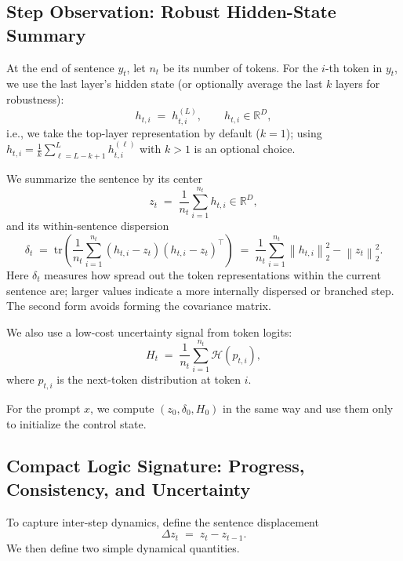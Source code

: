 \documentclass{article}
\newcommand{\R}{\mathbb{R}}
\newcommand{\norm}[1]{\left\lVert #1 \right\rVert}
\newcommand{\tr}{\mathrm{tr}}
\begin{document}
\subsection{Step Observation: Robust Hidden-State Summary}
\label{sec:obs}
At the end of sentence $y_t$, let $n_t$ be its number of tokens. 
For the $i$-th token in $y_t$, we use the last layer's hidden state (or optionally average the last $k$ layers for robustness):
\begin{equation}
h_{t,i} \;=\; h^{(L)}_{t,i},
\qquad h_{t,i}\in\R^D,
\label{eq:lastk}
\end{equation}
i.e., we take the top-layer representation by default ($k=1$); using $h_{t,i} = \frac{1}{k}\sum_{\ell=L-k+1}^{L} h^{(\ell)}_{t,i}$ with $k>1$ is an optional choice.

We summarize the sentence by its center
\begin{equation}
z_t \;=\; \frac{1}{n_t}\sum_{i=1}^{n_t} h_{t,i} \in \R^D,
\label{eq:zt}
\end{equation}
and its within-sentence dispersion
\begin{equation}
\delta_t \;=\; \tr\!\left(
\frac{1}{n_t}\sum_{i=1}^{n_t}(h_{t,i}-z_t)(h_{t,i}-z_t)^\top
\right)
\;=\; \frac{1}{n_t}\sum_{i=1}^{n_t} \norm{h_{t,i}}_2^2 - \norm{z_t}_2^2.
\label{eq:disp}
\end{equation}
Here $\delta_t$ measures how spread out the token representations within the current sentence are; larger values indicate a more internally dispersed or branched step. The second form avoids forming the covariance matrix.

We also use a low-cost uncertainty signal from token logits:
\begin{equation}
H_t \;=\; \frac{1}{n_t}\sum_{i=1}^{n_t} \mathcal{H}(p_{t,i}),
\label{eq:entropy}
\end{equation}
where $p_{t,i}$ is the next-token distribution at token $i$.

For the prompt $x$, we compute $(z_0,\delta_0,H_0)$ in the same way and use them only to initialize the control state.

\subsection{Compact Logic Signature: Progress, Consistency, and Uncertainty}
\label{sec:logic-signature}
To capture inter-step dynamics, define the sentence displacement
\begin{equation}
\Delta z_t \;=\; z_t - z_{t-1}.
\label{eq:deltaz}
\end{equation}
We then define two simple dynamical quantities.
\end{document}
